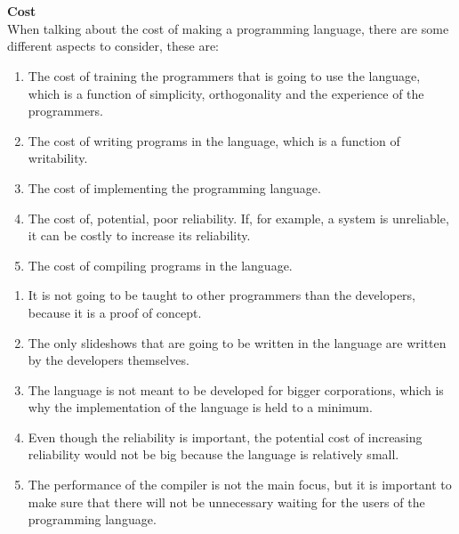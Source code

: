 \\ \\
\textbf{Cost} \\
When talking about the cost of making a programming language, there are some different aspects to consider, these are:
\begin{enumerate}
	\item The cost of training the programmers that is going to use the language, which is a function of simplicity, orthogonality and the experience of the programmers.
	\item The cost of writing programs in the language, which is a function of writability.
	\item The cost of implementing the programming language.
	\item The cost of, potential, poor reliability. If, for example, a system is unreliable, it can be costly to increase its reliability.
	\item The cost of compiling programs in the language.
\end{enumerate}

\begin{enumerate}
	\item It is not going to be taught to other programmers than the developers, because it is a proof of concept.
	\item The only slideshows that are going to be written in the language are written by the developers themselves.
 \item The language is not meant to be developed for bigger corporations, which is why the implementation of the language is held to a minimum.
	\item Even though the reliability is important, the potential cost of increasing reliability would not be big because the language is relatively small.
	\item The performance of the compiler is not the main focus, but it is important to make sure that there will not be unnecessary waiting for the users of the programming language.
\end{enumerate}


